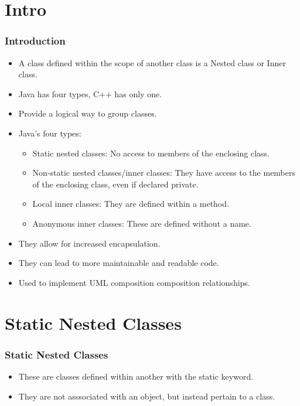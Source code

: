 \documentclass{beamer}
\begin{document}
\section{Intro}
\begin{frame}
\frametitle{Introduction}
\begin{itemize}
\item A class defined within the scope of another class is a {\color{purple} Nested class} or {\color{orange} Inner class}.
\item Java has four types, C++ has only one.
\item Provide a logical way to group classes.
\item Java's four types:
\begin{itemize}
\item {\color{green} Static nested classes}: No access to members of the enclosing class.
\item {\color{red} Non-static nested classes/inner classes}: They have access to the members of the enclosing class, even if declared {\color{blue} private}.
\item {\color{brown} Local inner classes}: They are defined within a method.
\item {\color{magenta} Anonymous inner classes}: These are defined without a name.
\end{itemize}
\item They allow for increased encapsulation.
\item They can lead to more maintainable and readable code.
\item Used to implement UML composition composition relationships.
\end{itemize}
\end{frame}
\section{Static Nested Classes}
\begin{frame}
\frametitle{Static Nested Classes}
\begin{itemize}
\item These are classes defined within another with the {\color{blue} static} keyword.
\item They are not asssociated with an object, but instead {\color{red} pertain} to a class.
\staticNest
\end{itemize}
\end{frame}
\end{document}
